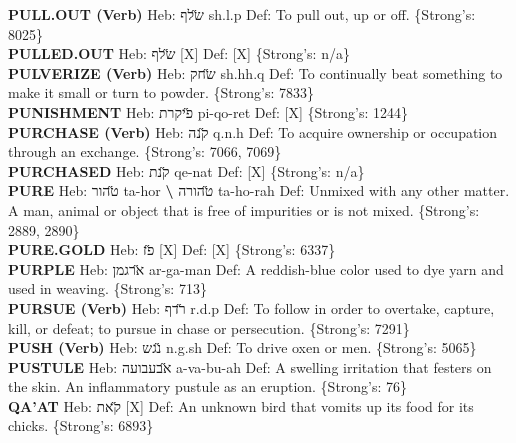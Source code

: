 {\textbf{PULL.OUT (Verb)} Heb: {\large\H שלף} sh.l.p Def: To pull out, up or off. \{Strong's: 8025\}\hfill{}\\

\textbf{PULLED.OUT} Heb: {\large\H שלף} {[}X{]} Def: {[}X{]} \{Strong's: n/a\}\hfill{}\\

\textbf{PULVERIZE (Verb)} Heb: {\large\H שחק} sh.hh.q Def: To continually beat something to make it small or turn to powder. \{Strong's: 7833\}\hfill{}\\

\textbf{PUNISHMENT} Heb: {\large\H פיקרת} pi-qo-ret Def: {[}X{]} \{Strong's: 1244\}\hfill{}\\

\textbf{PURCHASE (Verb)} Heb: {\large\H קנה} q.n.h Def: To acquire ownership or occupation through an exchange. \{Strong's: 7066, 7069\}\hfill{}\\

\textbf{PURCHASED} Heb: {\large\H קנת} qe-nat Def: {[}X{]} \{Strong's: n/a\}\hfill{}\\

\textbf{PURE} Heb: {\large\H טהור} ta-hor \textbf{\textbackslash{}} {\large\H טהורה} ta-ho-rah Def: Unmixed with any other matter. A man, animal or object that is free of impurities or is not mixed. \{Strong's: 2889, 2890\}\hfill{}\\

\textbf{PURE.GOLD} Heb: {\large\H פז} {[}X{]} Def: {[}X{]} \{Strong's: 6337\}\hfill{}\\

\textbf{PURPLE} Heb: {\large\H ארגמן} ar-ga-man Def: A reddish-blue color used to dye yarn and used in weaving. \{Strong's: 713\}\hfill{}\\

\textbf{PURSUE (Verb)} Heb: {\large\H רדף} r.d.p Def: To follow in order to overtake, capture, kill, or defeat; to pursue in chase or persecution. \{Strong's: 7291\}\hfill{}\\

\textbf{PUSH (Verb)} Heb: {\large\H נגש} n.g.sh Def: To drive oxen or men. \{Strong's: 5065\}\hfill{}\\

\textbf{PUSTULE} Heb: {\large\H אבעבועה} a-va-bu-ah Def: A swelling irritation that festers on the skin. An inflammatory pustule as an eruption. \{Strong's: 76\}\hfill{}\\

\textbf{QA'AT} Heb: {\large\H קאת} {[}X{]} Def: An unknown bird that vomits up its food for its chicks. \{Strong's: 6893\}\hfill{}\\

}

